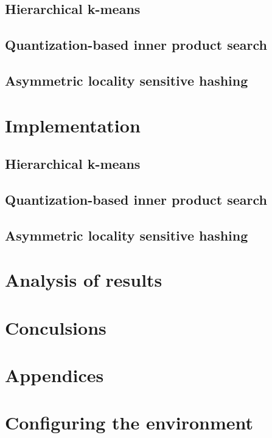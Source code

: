 \documentclass[12pt]{article}
\begin{document}
	\subsection{Hierarchical k-means}
	
	\subsection{Quantization-based inner product search}
	
	\subsection{Asymmetric locality sensitive hashing}
	
\section{Implementation}
	
	\subsection{Hierarchical k-means}
	
	\subsection{Quantization-based inner product search}
	
	\subsection{Asymmetric locality sensitive hashing}
	
\section{Analysis of results}
	
\section{Conculsions}
	


\newpage
\section{Appendices}
\label{sec:appendices}
\appendix
\section{Configuring the environment}
	
\end{document}

